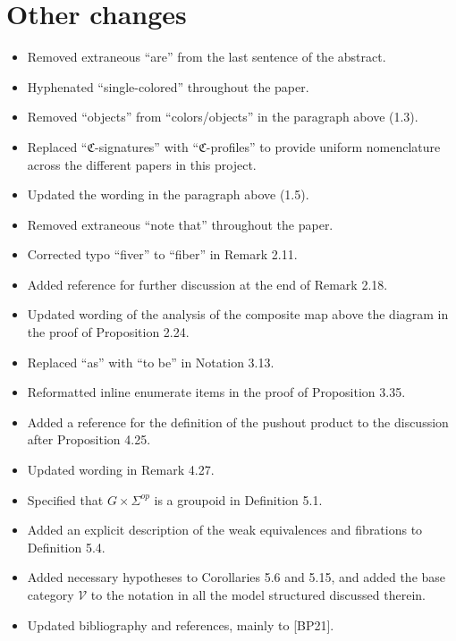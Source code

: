 \documentclass[a4paper,10pt
]{article}%
\numberwithin{equation}{section}
\numberwithin{figure}{section}
\theoremstyle{definition} %
\newcommand{\V}{\ensuremath{\mathcal V}}
\newcommand{\1}{\ensuremath{\mathbbm 1}}%
\begin{document}
\section*{Other changes}
\begin{itemize}
\item Removed extraneous ``are'' from the last sentence of the abstract.
\item Hyphenated ``single-colored'' throughout the paper.
\item Removed ``objects'' from ``colors/objects'' in the paragraph above (1.3).
\item Replaced ``$\mathfrak C$-signatures'' with ``$\mathfrak C$-profiles'' to provide uniform nomenclature across the different papers in this project.
\item Updated the wording in the paragraph above (1.5).
\item Removed extraneous ``note that'' throughout the paper.
\item Corrected typo ``fiver'' to ``fiber'' in Remark 2.11.
\item Added reference for further discussion at the end of Remark 2.18.
\item Updated wording of the analysis of the composite map above the diagram in the proof of Proposition 2.24.
\item Replaced ``as'' with ``to be'' in Notation 3.13.
\item Reformatted inline enumerate items in the proof of Proposition 3.35.
\item Added a reference for the definition of the pushout product to the discussion after Proposition 4.25.
\item Updated wording in Remark 4.27.
\item Specified that $G \times \Sigma^{op}$ is a groupoid in Definition 5.1.
\item Added an explicit description of the weak equivalences and fibrations to Definition 5.4.
\item Added necessary hypotheses to Corollaries 5.6 and 5.15, and added the base category $\V$ to the notation in all the model structured discussed therein.
\item Updated bibliography and references, mainly to [BP21].
\end{itemize}
\end{document}
